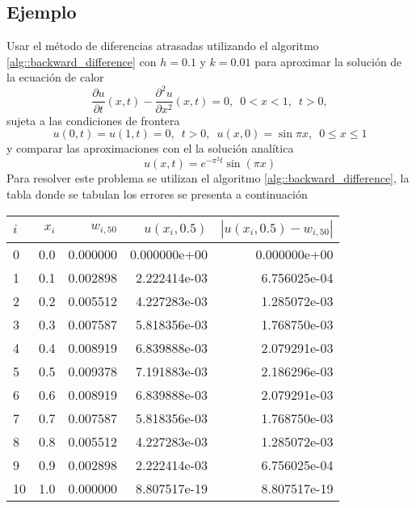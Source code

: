 \documentclass[a4paper]{article}
\begin{document}
\subsection{Ejemplo}
Usar el método de diferencias atrasadas utilizando el algoritmo \ref{alg::backward_difference} con $h=0.1$ y $k=0.01$ para aproximar la solución de la ecuación de calor
\begin{equation}
\frac{\partial u}{\partial t}(x,t) -\frac{\partial^2 u}{\partial x ^2}(x,t)=0, \,\,\, 0<x<1,\,\,\, t>0,
\end{equation}
sujeta a las condiciones de frontera
\begin{equation*}
u(0,t)=u(1,t)=0,\,\,\, t>0,\,\,\,u(x,0)=\sin{\pi x},\,\,\, 0\leq x \leq 1
\end{equation*}
y comparar las aproximaciones con el la solución analítica
\begin{equation}
u(x,t)=e^{-\pi^2 t}\sin{(\pi x)}
\end{equation}
Para  resolver este problema se utilizan el algoritmo \ref{alg::backward_difference}, la tabla donde se tabulan los errores se presenta a continuación\\
\begin{tabular}{lrrrr}
\toprule
$i$ &  $x_i$ &    $w_{i,50}$ &    $u(x_i,0.5)$ &  $|u(x_i,0.5)-w_{i,50}|$ \\
\midrule
0  &  0.0 &  0.000000 &  0.000000e+00 &         0.000000e+00 \\
1  &  0.1 &  0.002898 &  2.222414e-03 &         6.756025e-04 \\
2  &  0.2 &  0.005512 &  4.227283e-03 &         1.285072e-03 \\
3  &  0.3 &  0.007587 &  5.818356e-03 &         1.768750e-03 \\
4  &  0.4 &  0.008919 &  6.839888e-03 &         2.079291e-03 \\
5  &  0.5 &  0.009378 &  7.191883e-03 &         2.186296e-03 \\
6  &  0.6 &  0.008919 &  6.839888e-03 &         2.079291e-03 \\
7  &  0.7 &  0.007587 &  5.818356e-03 &         1.768750e-03 \\
8  &  0.8 &  0.005512 &  4.227283e-03 &         1.285072e-03 \\
9  &  0.9 &  0.002898 &  2.222414e-03 &         6.756025e-04 \\
10 &  1.0 &  0.000000 &  8.807517e-19 &         8.807517e-19 \\
\bottomrule
\end{tabular}
\end{document}
